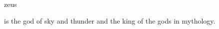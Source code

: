 \documentclass{stex}
\begin{document}
\begin{smodule}{zeus}
\begin{sparagraph}[style=symdoc]
 is the god of sky and thunder and the king of the gods in
 mythology.
\end{sparagraph}
\end{smodule}
\end{document}
